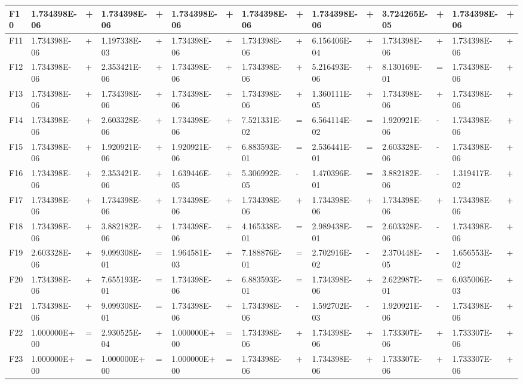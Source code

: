 \documentclass{article} %
\begin{document}
\begin{tabular}{|p{0.3in}|p{0.5in}|p{0.2in}|p{0.5in}|p{0.2in}|p{0.5in}|p{0.2in}|p{0.5in}|p{0.2in}|p{0.5in}|p{0.1in}|p{0.5in}|p{0.1in}|p{0.5in}|p{0.1in}|}
F10 & 1.734398E-06 & + & 1.734398E-06 & + & 1.734398E-06 & + & 1.734398E-06 & + & 1.734398E-06 & + & 3.724265E-05 & + & 1.734398E-06 & + \\ \hline 
F11 & 1.734398E-06 & + & 1.197338E-03 & + & 1.734398E-06 & + & 1.734398E-06 & + & 6.156406E-04 & + & 1.734398E-06 & + & 1.734398E-06 & + \\ \hline 
F12 & 1.734398E-06 & + & 2.353421E-06 & + & 1.734398E-06 & + & 1.734398E-06 & + & 5.216493E-06 & + & 8.130169E-01 & = & 1.734398E-06 & + \\ \hline 
F13 & 1.734398E-06 & + & 1.734398E-06 & + & 1.734398E-06 & + & 1.734398E-06 & + & 1.360111E-05 & + & 1.734398E-06 & + & 1.734398E-06 & + \\ \hline 
F14 & 1.734398E-06 & + & 2.603328E-06 & + & 1.734398E-06 & + & 7.521331E-02 & = & 6.564114E-02 & = & 1.920921E-06 & - & 1.734398E-06 & + \\ \hline 
F15 & 1.734398E-06 & + & 1.920921E-06 & + & 1.920921E-06 & + & 6.883593E-01 & = & 2.536441E-01 & = & 2.603328E-06 & - & 1.734398E-06 & + \\ \hline 
F16 & 1.734398E-06 & + & 2.353421E-06 & + & 1.639446E-05 & + & 5.306992E-05 & - & 1.470396E-01 & = & 3.882182E-06 & - & 1.319417E-02 & + \\ \hline 
F17 & 1.734398E-06 & + & 1.734398E-06 & + & 1.734398E-06 & + & 1.734398E-06 & + & 1.734398E-06 & + & 1.734398E-06 & + & 1.734398E-06 & + \\ \hline 
F18 & 1.734398E-06 & + & 3.882182E-06 & + & 1.734398E-06 & + & 4.165338E-01 & = & 2.989438E-01 & = & 2.603328E-06 & - & 1.734398E-06 & + \\ \hline 
F19 & 2.603328E-06 & + & 9.099308E-01 & = & 1.964581E-03 & + & 7.188876E-01 & = & 2.702916E-02 & - & 2.370448E-05 & - & 1.656553E-02 & + \\ \hline 
F20 & 1.734398E-06 & + & 7.655193E-01 & = & 1.734398E-06 & + & 6.883593E-01 & = & 1.734398E-06 & + & 2.622987E-01 & = & 6.035006E-03 & + \\ \hline 
F21 & 1.734398E-06 & + & 9.099308E-01 & = & 1.734398E-06 & + & 1.734398E-06 & - & 1.592702E-03 & - & 1.920921E-06 & - & 1.734398E-06 & + \\ \hline 
F22 & 1.000000E+00 & = & 2.930525E-04 & + & 1.000000E+00 & = & 1.734398E-06 & + & 1.734398E-06 & + & 1.733307E-06 & + & 1.733307E-06 & + \\ \hline 
F23 & 1.000000E+00 & = & 1.000000E+00 & = & 1.000000E+00 & = & 1.734398E-06 & + & 1.734398E-06 & + & 1.733307E-06 & + & 1.733307E-06 & + \\ \hline 

\end{tabular}
\end{document}
